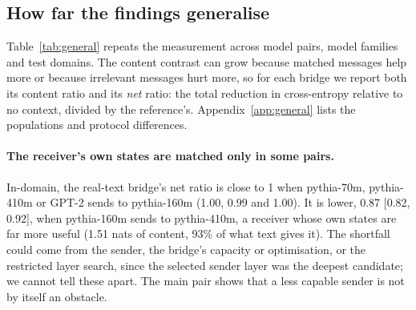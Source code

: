 \subsection{How far the findings generalise}
\label{sec:scale}

Table~\ref{tab:general} repeats the measurement across model pairs, model families and test domains. The content contrast can grow because matched messages help more or because irrelevant messages hurt more, so for each bridge we report both its content ratio and its \emph{net} ratio: the total reduction in cross-entropy relative to no context, divided by the reference's. Appendix~\ref{app:general} lists the populations and protocol differences.

\begin{table}[t]
\centering\small
\caption{Generalisation. For each bridge, content gain (other-document donor minus matched message) and net gain (no context minus matched message), each relative to the receiver-state reference of the same receiver on the same windows; reference content in nats. 95\% intervals over documents, fitting seeds and donor draws. All bridges use the communication objective; layer pairs were selected on validation text for each model pair. The code and review rows evaluate the main pair's bridges, fitted on WikiText-like text, without refitting. Too few review windows have a same-document donor to split content into article-level and window-specific parts (Appendix~\ref{app:general}).}
\label{tab:general}
{\footnotesize\setlength{\tabcolsep}{4pt}}
\end{table}

\paragraph{The receiver's own states are matched only in some pairs.} In-domain, the real-text bridge's net ratio is close to 1 when pythia-70m, pythia-410m or GPT-2 sends to pythia-160m (1.00, 0.99 and 1.00). It is lower, 0.87 [0.82, 0.92], when pythia-160m sends to pythia-410m, a receiver whose own states are far more useful (1.51 nats of content, 93\% of what text gives it). The shortfall could come from the sender, the bridge's capacity or optimisation, or the restricted layer search, since the selected sender layer was the deepest candidate; we cannot tell these apart. The main pair shows that a less capable sender is not by itself an obstacle.

